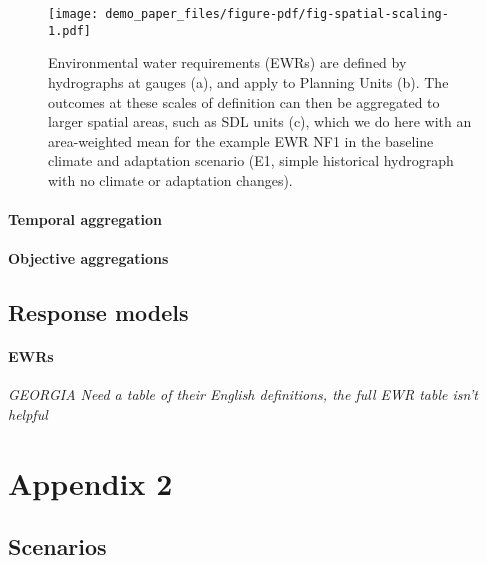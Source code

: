 \documentclass[
  number]{elsarticle}
\let\oldparagraph\paragraph
\renewcommand{\paragraph}[1]{\oldparagraph{#1}\mbox{}}
\begin{document}
\begin{figure}

{\centering \texttt{[image: demo\_paper\_files/figure-pdf/fig-spatial-scaling-1.pdf]}

}

\caption{\label{fig-spatial-scaling}Environmental water requirements
(EWRs) are defined by hydrographs at gauges (a), and apply to Planning
Units (b). The outcomes at these scales of definition can then be
aggregated to larger spatial areas, such as SDL units (c), which we do
here with an area-weighted mean for the example EWR NF1 in the baseline
climate and adaptation scenario (E1, simple historical hydrograph with
no climate or adaptation changes).}

\end{figure}

\hypertarget{temporal-aggregation}{%
\paragraph{Temporal aggregation}\label{temporal-aggregation}}

\hypertarget{objective-aggregations}{%
\paragraph{Objective aggregations}\label{objective-aggregations}}

\hypertarget{sec-ewr-table}{%
\subsection{Response models}\label{sec-ewr-table}}

\hypertarget{ewrs}{%
\paragraph{EWRs}\label{ewrs}}

\emph{GEORGIA Need a table of their English definitions, the full EWR
table isn't helpful}

\begin{table}

\end{table}

\hypertarget{appendix-2}{%
\section{Appendix 2}\label{appendix-2}}

\hypertarget{sec-scenarios}{%
\subsection{Scenarios}\label{sec-scenarios}}
\end{document}
